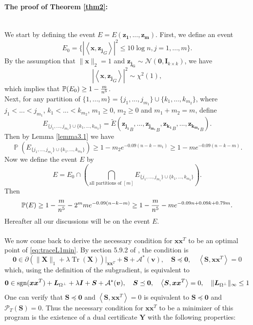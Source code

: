 \documentclass[11pt]{article}
\newcommand{\<}{\langle}
\renewcommand{\>}{\rangle}
\renewcommand{\P}{\operatorname{\mathbb{P}}}
\newcommand{\vct}[1]{\bm{#1}}
\newcommand{\mtx}[1]{\bm{#1}}
\newcommand{\sgn}{\operatorname{sgn}}
\newcommand{\tr}{\operatorname{Tr}}
\numberwithin{equation}{section}
\newcommand{\PT}{\mathcal{P}_T}
\newcommand{\cA}{\mathcal{A}}
\begin{document}
\paragraph{The proof of Theorem \ref{thm2}:}~~\\
We start by defining the event $E=E(\vct{z_1}, ..., \vct{z_m})$. First, we define an event
 \[
 E_0=\{\left\vert\left<\vct{x}, {\vct{z_j}}_G\right>\right\vert^2\leq 10\log n, j=1,..., m\}.
 \]
 By the assumption that $\|\vct{x}\|_2=1$ and $\vct{z_{j_G}} \sim \mathcal{N}(\vct{0}, \mtx{I}_{k \times k})$, we have
\[
\left\vert\left<\vct{x}, {\vct{z_j}}_G\right>\right\vert^2 \sim \chi^2(1),
\]
which implies that $\P(E_0)\geq 1-{m\over{n^5}}$. \\
Next, for any partition of $\{1,...,m\}=\{j_1,...,j_{m_1}\}\cup\{k_1,...,k_{m_2}\}$, where $j_1<...<j_{m_1}$, $k_1<...<k_{m_2}$, $m_1\geq 0$, $m_2\geq 0$ and $m_1+m_2=m$, define
\[
E_{\{j_1,...,j_{m_1}\}\cup\{k_1,...,k_{m_2}\}}=\widetilde{E}({\vct{z_{j_1}}}_B, ..., {\vct{z_{j_{m_1}}}}_B, {\vct{z_{k_1}}}_B, ..., {\vct{z_{k_{m_2}}}}_B).
\]
Then by Lemma \ref{lemma3.1} we have 
\[
\P(E_{\{j_1,...,j_{m_1}\}\cup\{k_1,...,k_{m_2}\}})\geq 1-m_2e^{-0.09(n-k-m_1)}\geq 1-me^{-0.09(n-k-m)}.
\]
Now we define the event $E$ by
\[
E=E_0\cap\left(\bigcap_{\text{all partitions of $[m]$}} E_{\{j_1,...,j_{m_1}\}\cup\{k_1,...,k_{m_2}\}}\right).
\]
Then
\[
\P(E)\geq 1-{m\over{n^5}}-2^m m e^{-0.09(n-k-m)}\geq 1-{m\over{n^5}}-m e^{-0.09n+0.09k+0.79m}.
\]
Hereafter all our discussions will be on the event $E$.\\
\\
We now come back to derive the necessary condition for $\vct{x}\vct{x}^T$ to be an optimal point 
of \eqref{eq:traceL1min}. By section 5.9.2 of \cite{Boyd}, the condition is
\[
\mtx{0} \in \partial(\|\mtx{X}\|_1 + \lambda \tr(\mtx{X}))|_{\vct{x}\vct{x}^T} + \mtx{S} + \cA^*(\vct{v}), \quad \mtx{S} \preceq \mtx{0}, 
\quad \left< \mtx{S},  \vct{x}\vct{x}^T\right> = 0 
\]
which, using the definition of the subgradient, is equivalent to
\[
\mtx{0} \in \sgn(\vct{x}\vct{x}^T) + \mtx{L}_{\Omega^\perp} + \lambda \mtx{I} + \mtx{S} + \cA^*(\vct{v}), \quad \mtx{S} \preceq \mtx
{0}, \quad \left< \mtx{S}, \vct{x}\vct{x}^T\right> = 0, \quad \|\mtx{L}_{\Omega^\perp}\|_\infty \leq 1 \\
\]
One can verify that $\mtx{S} \preceq \mtx{0}$ and  $\left< \mtx{S}, \vct{x}\vct{x}^T\right> = 0 $ is equivalent to $\mtx{S} \preceq \mtx{0}$ 
and $ \PT(\mtx{S}) = 0$. 
Thus the necessary condition for $\vct{x}\vct{x}^T$ to be a minimizer of this program is the existence of a dual certificate $\mtx{Y} $ with the following properties:
\end{document}
